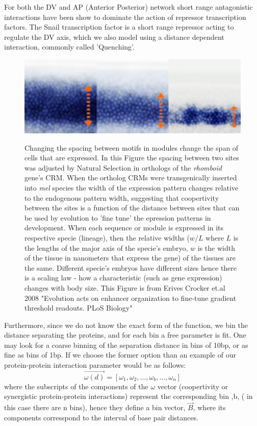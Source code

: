 For both the DV and AP (Anterior Posterior) network short range antagonistic interactions have been show to dominate the action of repressor transcription factors\cite{pmid20087339}.  The Snail transcription factor is a short range repressor acting to regulate the DV axis, which we also model using a distance dependent interaction, commonly called 'Quenching'\cite{pmid20087339}.
\begin{figure}
  \includegraphics[width=1\textwidth]{rhoNEEs}\\
  \caption{ Changing the spacing between motifs in modules change the span of cells that are expressed.  In this Figure the spacing between two sites was adjusted by Natural Selection in orthologs of the \textit{rhomboid} gene's CRM. When the ortholog CRMs were transgenically inserted into \textit{mel} species the width of the expression pattern changes relative to the endogenous pattern width, suggesting that coopertivity between the sites is a function of the distance between sites that can be used by evolution to 'fine tune' the epression patterns in development.  When each sequence or module is expressed in its respective specie (lineage), then the relative widths ($w/L$ where $L$ is the lengths of the major axis of the specie's embryo, $w$ is the width of the tissue in nanometers that express the gene) of the tissues are the same.  Different specie's embryos have different sizes hence there is a scaling law - how a characteristic (such as gene expression) changes with body size.  This Figure is from Erives Crocker et.al 2008 "Evolution acts on enhancer organization to fine-tune gradient threshold readouts. PLoS Biology"}\label{rhoNEEs}
\end{figure}

  Furthermore, since we do not know the exact form of the function, we bin the distance separating the proteins, and for each bin a free parameter is fit.  One may look for a coarse binning of the separation distance in bins of 10bp, or as fine as bins of 1bp.  If we choose the former option than an example of our protein-protein interaction parameter would be as follows:
\begin{equation}\label{}
   \overrightarrow{ \omega(d)} =  [ \omega_1 ,\omega_2 ,\ldots, \omega_b,\ldots,  \omega_n ]
\end{equation}
where the subscripts of the components of the $\omega$ vector (coopertivity or synergistic protein-protein interactions)  represent the corresponding bin ,b, ( in this case there are n bins), hence they define a bin vector, $\overrightarrow{B}$, where its components corresspond to the interval of base pair distances.

